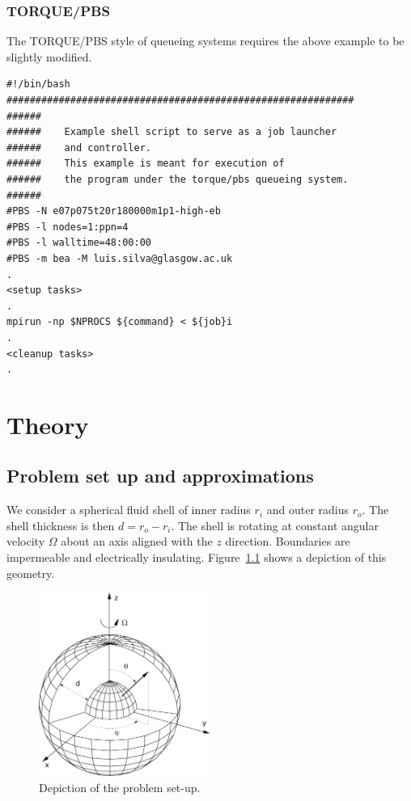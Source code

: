 \documentclass[a4paper,10pt]{book}
\begin{document}
\subsection{TORQUE/PBS}
The TORQUE/PBS style of queueing systems requires the above example to be
slightly modified.
\begin{small}
\begin{verbatim}
#!/bin/bash
############################################################
######
######    Example shell script to serve as a job launcher
######    and controller.
######    This example is meant for execution of
######    the program under the torque/pbs queueing system.
######
#PBS -N e07p075t20r180000m1p1-high-eb
#PBS -l nodes=1:ppn=4
#PBS -l walltime=48:00:00
#PBS -m bea -M luis.silva@glasgow.ac.uk
.
<setup tasks>
.
mpirun -np $NPROCS ${command} < ${job}i
.
<cleanup tasks>
.
\end{verbatim}
\end{small}

\chapter{Theory}

\section{Problem set up and approximations}
\label{s:problemSetup}
We consider a spherical fluid shell of inner radius $r_i$ and outer radius
$r_o$. The shell thickness is then $d = r_o - r_i$. The shell is rotating at
constant angular velocity $\Omega$ about an axis aligned with the $z$ direction.
Boundaries are impermeable and electrically insulating. Figure~\ref{f:setup}
shows a depiction of this geometry.
\begin{figure}[htb]
\centering
\includegraphics[width=0.5\textwidth]{figs/sphshell}
\caption{Depiction of the problem set-up.}
\label{f:setup}
\end{figure}
\end{document}
